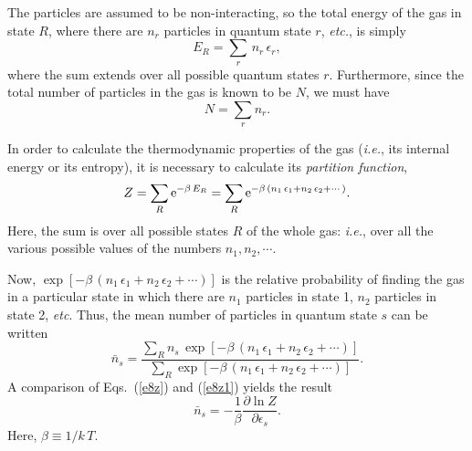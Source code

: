 The particles are assumed to be non-interacting, so  the
total energy of the gas in state $R$, where there are $n_r$ particles
in quantum state $r$, {\em etc.}, is simply
\begin{equation}
E_R = \sum_r\,n_r\,\epsilon_r,
\end{equation}
where the sum extends over all possible quantum states $r$. Furthermore,
since the total number of particles in the gas is known to be $N$, we must
have
\begin{equation}
N = \sum_r n_r.
\end{equation}

In order to calculate the thermodynamic properties of the gas ({\em i.e.}, 
its internal energy  or its entropy), it is necessary to
calculate its {\em partition function},
\begin{equation}
Z =\sum_R {\rm e}^{-\beta\,E_R} = \sum_R {\rm e}^{-\beta\,(n_1\,\epsilon_1+n_2\,
\epsilon_2+\cdots)}.\label{e8z}
\end{equation}
Here, the sum is over all possible states $R$ of the whole gas:
{\em i.e.}, over all the various possible values of the
numbers $n_1, n_2,\cdots$. 

Now, $\exp[-\beta\,(n_1\,\epsilon_1+n_2\,\epsilon_2+\cdots)]$ is
the relative probability of finding the gas in a particular state in which
there are $n_1$ particles in state 1, $n_2$ particles in state 2, {\em etc}. 
Thus, the mean number of particles in quantum state $s$ can be written
\begin{equation}\label{e8z1}
\bar{n}_s = \frac{\sum_R n_s\,\exp[-\beta\,(n_1\,\epsilon_1+n_2\,\epsilon_2+\cdots)]}
{\sum_R \exp[-\beta\,(n_1\,\epsilon_1+n_2\,\epsilon_2+\cdots)]}.
\end{equation}
A comparison of Eqs.~(\ref{e8z}) and (\ref{e8z1})  yields the result
\begin{equation}\label{e820}
\bar{n}_s = -\frac{1}{\beta}\frac{\partial \ln Z}{\partial\epsilon_s}.
\end{equation}
Here, $\beta\equiv 1/k\,T$.

